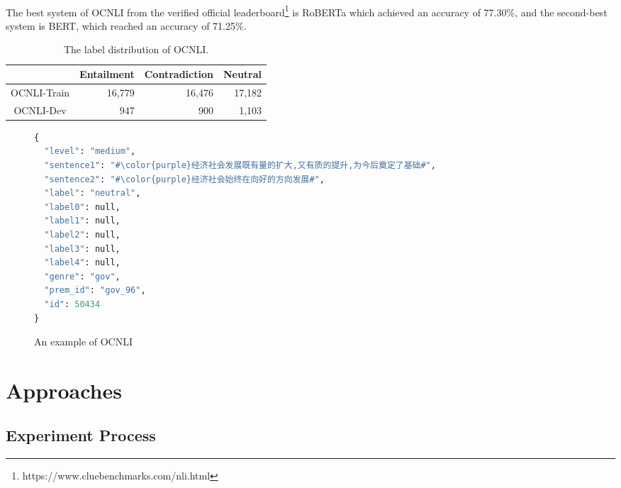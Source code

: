 \documentclass{article}
\begin{document}
\begin{CJK*}{UTF8}{bkai}
\paragraph{}
The best system of OCNLI from the verified official leaderboard\footnote{https://www.cluebenchmarks.com/nli.html} is RoBERTa which achieved an accuracy of 77.30\%, and the second-best system is BERT, which reached an accuracy of 71.25\%.

\begin{table}[ht!]
  \centering
  \begin{tabular}{|c|r|r|r|}
  \hline
              & Entailment & Contradiction & Neutral \\ \hline
  OCNLI-Train & 16,779     & 16,476        & 17,182  \\ \hline
  OCNLI-Dev   & 947        & 900           & 1,103   \\ \hline
  \end{tabular}
  \caption{The label distribution of OCNLI.}
\end{table}

\begin{figure}
\caption{An example of OCNLI}
\begin{minipage}{\linewidth}
\begin{CJK*}{UTF8}{gbsn}
\begin{lstlisting}[language=Python, escapechar=\#]
{
  "level": "medium",
  "sentence1": "#\color{purple}经济社会发展既有量的扩大,又有质的提升,为今后奠定了基础#",
  "sentence2": "#\color{purple}经济社会始终在向好的方向发展#",
  "label": "neutral",
  "label0": null,
  "label1": null,
  "label2": null,
  "label3": null,
  "label4": null,
  "genre": "gov",
  "prem_id": "gov_96",
  "id": 50434
}
\end{lstlisting}
\end{CJK*}
\end{minipage}
\end{figure}

\section{Approaches} \label{section:approaches}
\subsection{Experiment Process}

\end{CJK*}
\end{document}
